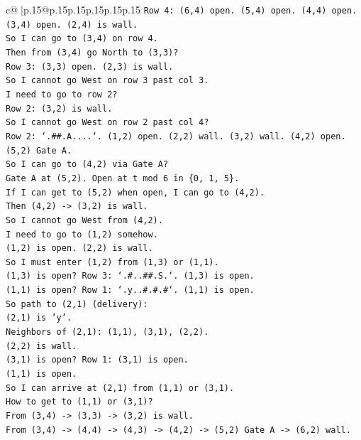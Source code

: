 \documentclass{article}
\begin{document}
{\begin{supertabular}{c@{$\;$}|p{.15\linewidth}@{}p{.15\linewidth}p{.15\linewidth}p{.15\linewidth}p{.15\linewidth}p{.15\linewidth}}
{{{\texttt{Row 4: (6,4) open. (5,4) open. (4,4) open. (3,4) open. (2,4) is wall.} \\
\texttt{So I can go to (3,4) on row 4.} \\
\texttt{Then from (3,4) go North to (3,3)?} \\
\texttt{Row 3: (3,3) open. (2,3) is wall.} \\
\texttt{So I cannot go West on row 3 past col 3.} \\
\texttt{I need to go to row 2?} \\
\texttt{Row 2: (3,2) is wall.} \\
\texttt{So I cannot go West on row 2 past col 4?} \\
\texttt{Row 2: `.\#\#.A....`. (1,2) open. (2,2) wall. (3,2) wall. (4,2) open. (5,2) Gate A.} \\
\texttt{So I can go to (4,2) via Gate A?} \\
\texttt{Gate A at (5,2). Open at t mod 6 in \{0, 1, 5\}.} \\
\texttt{If I can get to (5,2) when open, I can go to (4,2).} \\
\texttt{Then (4,2) {-}> (3,2) is wall.} \\
\texttt{So I cannot go West from (4,2).} \\
\texttt{I need to go to (1,2) somehow.} \\
\texttt{(1,2) is open. (2,2) is wall.} \\
\texttt{So I must enter (1,2) from (1,3) or (1,1).} \\
\texttt{(1,3) is open? Row 3: `.\#..\#\#.S.`. (1,3) is open.} \\
\texttt{(1,1) is open? Row 1: `.y..\#.\#.\#`. (1,1) is open.} \\
\texttt{So path to (2,1) (delivery):} \\
\texttt{(2,1) is 'y'.} \\
\texttt{Neighbors of (2,1): (1,1), (3,1), (2,2).} \\
\texttt{(2,2) is wall.} \\
\texttt{(3,1) is open? Row 1: (3,1) is open.} \\
\texttt{(1,1) is open.} \\
\texttt{So I can arrive at (2,1) from (1,1) or (3,1).} \\
\texttt{How to get to (1,1) or (3,1)?} \\
\texttt{From (3,4) {-}> (3,3) {-}> (3,2) is wall.} \\
\texttt{From (3,4) {-}> (4,4) {-}> (4,3) {-}> (4,2) {-}> (5,2) Gate A {-}> (6,2) wall.} \\
}}}
\end{supertabular}}
\end{document}
